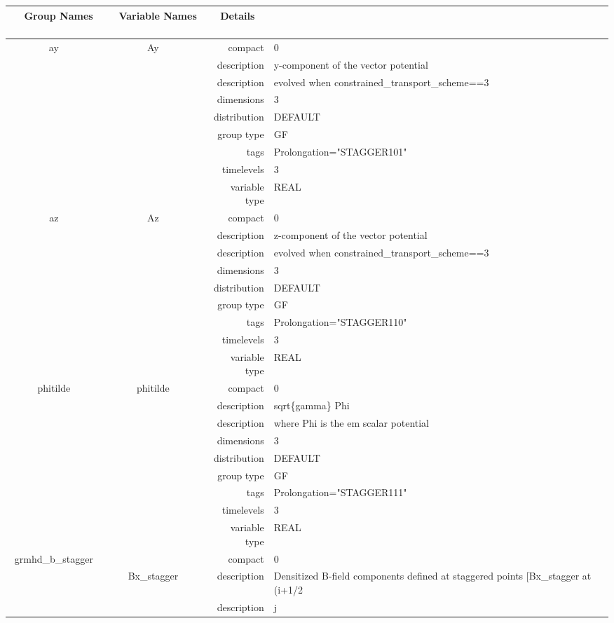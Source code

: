 \begin{tabular*}{150mm}{|c|c@{\extracolsep{\fill}}|rl|} \hline 
~ {\bf Group Names} ~ & ~ {\bf Variable Names} ~  &{\bf Details} ~ & ~ \\ 
\hline 
ay & Ay & compact & 0 \\ 
 &  & description & y-component of the vector potential \\ 
& ~ & description &  evolved when constrained\_transport\_scheme==3 \\ 
 &  & dimensions & 3 \\ 
 &  & distribution & DEFAULT \\ 
 &  & group type & GF \\ 
 &  & tags & Prolongation="STAGGER101" \\ 
 &  & timelevels & 3 \\ 
 &  & variable type & REAL \\ 
\hline 
az & Az & compact & 0 \\ 
 &  & description & z-component of the vector potential \\ 
& ~ & description &  evolved when constrained\_transport\_scheme==3 \\ 
 &  & dimensions & 3 \\ 
 &  & distribution & DEFAULT \\ 
 &  & group type & GF \\ 
 &  & tags & Prolongation="STAGGER110" \\ 
 &  & timelevels & 3 \\ 
 &  & variable type & REAL \\ 
\hline 
phitilde & phitilde & compact & 0 \\ 
 &  & description & sqrt\{gamma\} Phi \\ 
& ~ & description &  where Phi is the em scalar potential \\ 
 &  & dimensions & 3 \\ 
 &  & distribution & DEFAULT \\ 
 &  & group type & GF \\ 
 &  & tags & Prolongation="STAGGER111" \\ 
 &  & timelevels & 3 \\ 
 &  & variable type & REAL \\ 
\hline 
grmhd\_b\_stagger &  & compact & 0 \\ 
 & Bx\_stagger & description & Densitized B-field components defined at staggered points [Bx\_stagger at (i+1/2 \\ 
& ~ & description & j \\ 

\end{tabular*}

